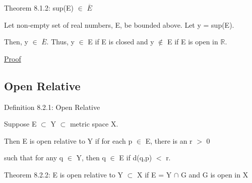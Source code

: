 	\vspace{0.5cm}

{ \color{red} Theorem 8.1.2: sup(E) $\in$ $\overline{E}$ }

    \begin{adjustbox}{minipage=14cm, right, vspace=0.1cm 0cm}
        Let non-empty set of real numbers, E, be bounded above.
        Let y = sup(E).
		
		Then, y $\in$ $\overline{E}$.
        Thus, y $\in$ E if E is closed
		and y $\not \in$ E if E is open in $\mathbb{R}$.
    \end{adjustbox}

{ \color{magenta} \underline{Proof} }






\subsection{ Open Relative }

{ \color{blue} Definition 8.2.1: Open Relative }

	\begin{adjustbox}{minipage=14cm, right, vspace=0.1cm 0cm}
		Suppose E $\subset$ Y $\subset$ metric space X.

		Then E is open relative to Y if for each p $\in$ E, there is an
		r $>$ 0

		such that for any q $\in$ Y, then q $\in$ E if d(q,p) $<$ r. \\
	\end{adjustbox}

\newpage

{ \color{red} Theorem 8.2.2: E is open relative to Y $\subset$ X
if E = Y $\cap$ G and G is open in X} 

